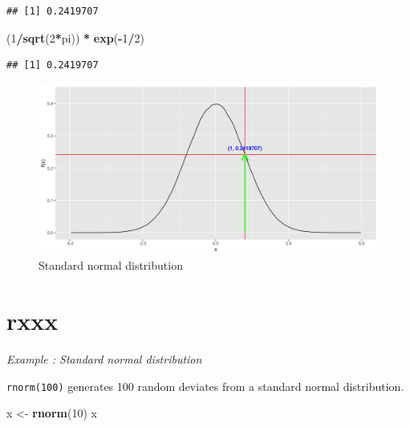 \documentclass[]{book}
\newenvironment{Shaded}{\begin{snugshade}}{\end{snugshade}}
\newcommand{\DecValTok}[1]{\textcolor[rgb]{0.00,0.00,0.81}{#1}}
\newcommand{\KeywordTok}[1]{\textcolor[rgb]{0.13,0.29,0.53}{\textbf{#1}}}
\newcommand{\NormalTok}[1]{#1}
\newcommand{\OperatorTok}[1]{\textcolor[rgb]{0.81,0.36,0.00}{\textbf{#1}}}
\newcommand{\StringTok}[1]{\textcolor[rgb]{0.31,0.60,0.02}{#1}}
\begin{document}
\begin{verbatim}
## [1] 0.2419707
\end{verbatim}

\begin{Shaded}
\begin{Highlighting}[]
\NormalTok{(}\DecValTok{1}\OperatorTok{/}\KeywordTok{sqrt}\NormalTok{(}\DecValTok{2}\OperatorTok{*}\NormalTok{pi)) }\OperatorTok{*}\StringTok{ }\KeywordTok{exp}\NormalTok{(}\OperatorTok{-}\DecValTok{1}\OperatorTok{/}\DecValTok{2}\NormalTok{)}
\end{Highlighting}
\end{Shaded}

\begin{verbatim}
## [1] 0.2419707
\end{verbatim}

\begin{figure}

{\centering \includegraphics{figure/norm5-1} 

}

\caption{Standard normal distribution}\label{fig:norm5}
\end{figure}

\hypertarget{rxxx}{%
\section{rxxx}\label{rxxx}}

\emph{Example : Standard normal distribution}

\texttt{rnorm(100)} generates 100 random deviates from a standard normal distribution.

\begin{Shaded}
\begin{Highlighting}[]
\NormalTok{x <-}\StringTok{ }\KeywordTok{rnorm}\NormalTok{(}\DecValTok{10}\NormalTok{)}
\NormalTok{x}
\end{Highlighting}
\end{Shaded}
\end{document}
